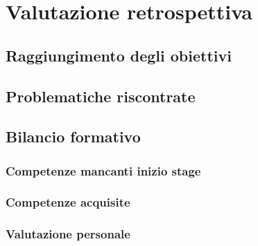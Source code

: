 
\chapter{Valutazione retrospettiva}
\label{cap:conclusioni}


\section{Raggiungimento degli obiettivi}

\section{Problematiche riscontrate}


\section{Bilancio formativo}

\subsection{Competenze mancanti inizio stage}

\subsection{Competenze acquisite}

\subsection{Valutazione personale}

